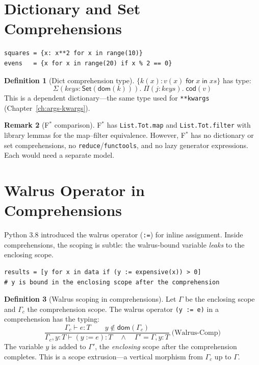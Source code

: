 \documentclass[11pt,a4paper]{report}
\theoremstyle{definition}
\newtheorem{definition}{Definition}[chapter]
\newtheorem{remark}[definition]{Remark}
\theoremstyle{plain}
\newcommand{\fstar}{F$^{*}$}
\begin{document}
\section{Dictionary and Set Comprehensions}

\begin{lstlisting}[style=python]
squares = {x: x**2 for x in range(10)}
evens   = {x for x in range(20) if x % 2 == 0}
\end{lstlisting}

\begin{definition}[Dict comprehension type]
$\{k(x) : v(x) \;\mathsf{for}\; x \;\mathsf{in}\; \mathit{xs}\}$ has type:
\[
  \Sigma(\mathit{keys} : \mathsf{Set}(\mathsf{dom}(k))).\;
  \Pi(j : \mathit{keys}).\; \mathsf{cod}(v)
\]
This is a dependent dictionary---the same type used for \texttt{**kwargs}
(Chapter~\ref{ch:args-kwargs}).
\end{definition}

\begin{remark}[\fstar{} comparison]
\fstar{} has \lstinline[style=fstar]|List.Tot.map| and
\lstinline[style=fstar]|List.Tot.filter| with library lemmas for the map--filter
equivalence.  However, \fstar{} has no dictionary or set comprehensions, no
\texttt{reduce}/\texttt{functools}, and no lazy generator expressions.  Each
would need a separate model.
\end{remark}

\section{Walrus Operator in Comprehensions}

Python 3.8 introduced the walrus operator (\texttt{:=}) for inline assignment.
Inside comprehensions, the scoping is subtle: the walrus-bound variable
\emph{leaks} to the enclosing scope.

\begin{lstlisting}[style=python]
results = [y for x in data if (y := expensive(x)) > 0]
# y is bound in the enclosing scope after the comprehension
\end{lstlisting}

\begin{definition}[Walrus scoping in comprehensions]
Let $\Gamma$ be the enclosing scope and $\Gamma_c$ the comprehension scope.
The walrus operator \lstinline[style=python]|(y := e)| in a comprehension
has the typing:
\[
  \frac{
    \Gamma_c \vdash e : T \qquad
    y \notin \mathsf{dom}(\Gamma_c)
  }{
    \Gamma_c, y : T \vdash (y \mathbin{:=} e) : T
    \quad\wedge\quad
    \Gamma' = \Gamma, y : T
  }
  \;\text{(Walrus-Comp)}
\]
The variable $y$ is added to $\Gamma'$, the \emph{enclosing} scope after
the comprehension completes. This is a scope extrusion---a vertical morphism
from $\Gamma_c$ up to $\Gamma$.
\end{definition}
\end{document}

